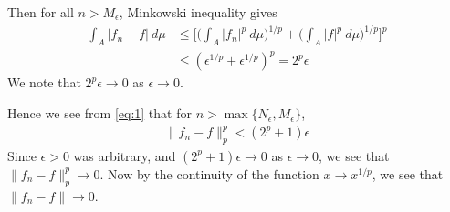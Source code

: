 \documentclass[12pt]{exam}
\theoremstyle{plain} %
\theoremstyle{definition} %
\theoremstyle{remark} %
\begin{document}
\begin{questions}
  Then for all $n > M_\epsilon$, Minkowski inequality gives
  \begin{align*}
    \int_A |f_n - f| \ d \mu &\le \Bigg[\Big(\int_A |f_n|^p \ d \mu
    \Big)^{1/p} + \Big(\int_A |f|^p \ d \mu \Big)^{1/p} \Bigg]^p \\
    &\le (\epsilon^{1/p} + \epsilon^{1/p})^p = 2^p \epsilon
  \end{align*}
  We note that $2^p \epsilon \to 0$ as $\epsilon \to 0$.

  Hence we see from \autoref{eq:1} that for $n > \max\{N_\epsilon,
  M_\epsilon\}$,
  \begin{align*}
    \|f_n - f\|^p_p < (2^p + 1)\epsilon
  \end{align*}
  Since $\epsilon>0$ was arbitrary, and $(2^p + 1)\epsilon \to 0$ as
  $ \epsilon \to 0$, we see that $\|f_n - f\|_p^p \to 0$. Now by the
  continuity of the function
  $x \to x^{1/p}$, we see that $\|f_n - f\| \to 0$.
\end{questions}
\printbibliography[heading=bibintoc]
\end{document}
